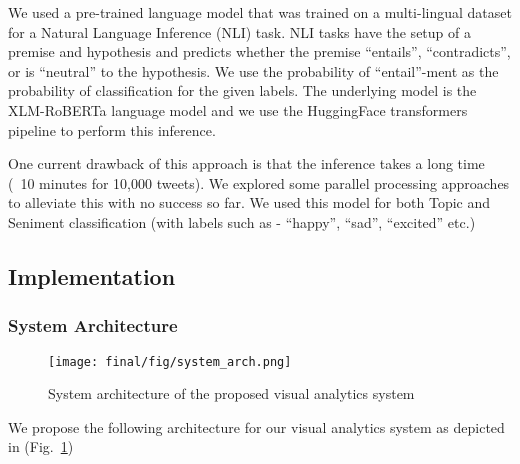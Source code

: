 We used a pre-trained language model that was trained on a multi-lingual dataset for a Natural Language Inference (NLI) task. NLI tasks have the setup of a premise and hypothesis and predicts whether the premise ``entails'', ``contradicts'', or is ``neutral'' to the hypothesis. We use the probability of ``entail''-ment as the probability of classification for the given labels. The underlying model is the XLM-RoBERTa language model\cite{xlmroberta} and we use the HuggingFace transformers pipeline to perform this inference.

One current drawback of this approach is that the inference takes a long time (~10 minutes for 10,000 tweets). We explored some parallel processing approaches to alleviate this with no success so far. We used this model for both Topic and Seniment classification (with labels such as - ``happy'', ``sad'', ``excited'' etc.)

\subsection{Implementation}

\subsubsection{System Architecture}
\begin{figure}[ht]
 \centering %
 \texttt{[image: final/fig/system\_arch.png]}
 \caption{System architecture of the proposed visual analytics system}
 \label{fig:architecture}
\end{figure}



We propose the following architecture for our visual analytics system  as depicted in (Fig.~\ref{fig:architecture})

